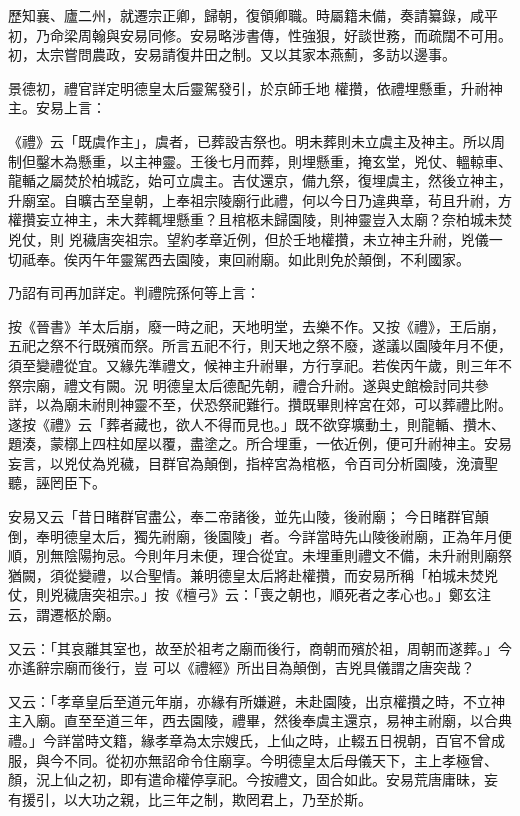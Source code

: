 \begin{pinyinscope}
 歷知襄、廬二州，就遷宗正卿，歸朝，復領卿職。時屬籍未備，奏請纂錄，咸平初，乃命梁周翰與安易同修。安易略涉書傳，性強狠，好談世務，而疏闊不可用。初，太宗嘗問農政，安易請復井田之制。又以其家本燕薊，多訪以邊事。



 景德初，禮官詳定明德皇太后靈駕發引，於京師壬地
 權攢，依禮埋懸重，升祔神主。安易上言：



 《禮》云「既虞作主」，虞者，已葬設吉祭也。明未葬則未立虞主及神主。所以周制但鑿木為懸重，以主神靈。王後七月而葬，則埋懸重，掩玄堂，兇仗、轀輬車、龍輴之屬焚於柏城訖，始可立虞主。吉仗還京，備九祭，復埋虞主，然後立神主，升廟室。自曠古至皇朝，上奉祖宗陵廟行此禮，何以今日乃違典章，茍且升祔，方權攢妄立神主，未大葬輒埋懸重？且棺柩未歸園陵，則神靈豈入太廟？奈柏城未焚兇仗，則
 兇穢唐突祖宗。望約孝章近例，但於壬地權攢，未立神主升祔，兇儀一切祗奉。俟丙午年靈駕西去園陵，東回祔廟。如此則免於顛倒，不利國家。



 乃詔有司再加詳定。判禮院孫何等上言：



 按《晉書》羊太后崩，廢一時之祀，天地明堂，去樂不作。又按《禮》，王后崩，五祀之祭不行既殯而祭。所言五祀不行，則天地之祭不廢，遂議以園陵年月不便，須至變禮從宜。又緣先準禮文，候神主升祔畢，方行享祀。若俟丙午歲，則三年不祭宗廟，禮文有闕。況
 明德皇太后德配先朝，禮合升祔。遂與史館檢討同共參詳，以為廟未祔則神靈不至，伏恐祭祀難行。攢既畢則梓宮在郊，可以葬禮比附。遂按《禮》云「葬者藏也，欲人不得而見也。」既不欲穿壙動土，則龍輴、攢木、題湊，蒙槨上四柱如屋以覆，盡塗之。所合埋重，一依近例，便可升祔神主。安易妄言，以兇仗為兇穢，目群官為顛倒，指梓宮為棺柩，令百司分析園陵，浼瀆聖聽，誣罔臣下。



 安易又云「昔日睹群官盡公，奉二帝諸後，並先山陵，後祔廟；
 今日睹群官顛倒，奉明德皇太后，獨先祔廟，後園陵」者。今詳當時先山陵後祔廟，正為年月便順，別無陰陽拘忌。今則年月未便，理合從宜。未埋重則禮文不備，未升祔則廟祭猶闕，須從變禮，以合聖情。兼明德皇太后將赴權攢，而安易所稱「柏城未焚兇仗，則兇穢唐突祖宗。」按《檀弓》云：「喪之朝也，順死者之孝心也。」鄭玄注云，謂遷柩於廟。



 又云：「其哀離其室也，故至於祖考之廟而後行，商朝而殯於祖，周朝而遂葬。」今亦遙辭宗廟而後行，豈
 可以《禮經》所出目為顛倒，吉兇具儀謂之唐突哉？



 又云：「孝章皇后至道元年崩，亦緣有所嫌避，未赴園陵，出京權攢之時，不立神主入廟。直至至道三年，西去園陵，禮畢，然後奉虞主還京，易神主祔廟，以合典禮。」今詳當時文籍，緣孝章為太宗嫂氏，上仙之時，止輟五日視朝，百官不曾成服，與今不同。從初亦無詔命令住廟享。今明德皇太后母儀天下，主上孝極曾、顏，況上仙之初，即有遣命權停享祀。今按禮文，固合如此。安易荒唐庸昧，妄
 有援引，以大功之親，比三年之制，欺罔君上，乃至於斯。




\end{pinyinscope}
